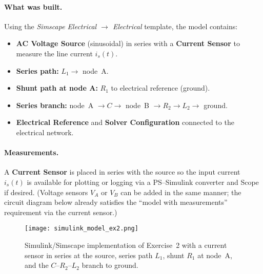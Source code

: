 \documentclass{article}
\begin{document}
\paragraph{What was built.}
Using the \emph{Simscape Electrical $\rightarrow$ Electrical} template, the model contains:
\begin{itemize}
  \item \textbf{AC Voltage Source} (sinusoidal) in series with a \textbf{Current Sensor} to measure the line current $i_s(t)$.
  \item \textbf{Series path:} $L_1 \rightarrow$ node~A.
  \item \textbf{Shunt path at node A:} $R_1$ to electrical reference (ground).
  \item \textbf{Series branch:} node~A $\rightarrow C \rightarrow$ node~B $\rightarrow R_2 \rightarrow L_2 \rightarrow$ ground.
  \item \textbf{Electrical Reference} and \textbf{Solver Configuration} connected to the electrical network.
\end{itemize}

\paragraph{Measurements.}
A \textbf{Current Sensor} is placed in series with the source so the input current $i_s(t)$ is available for plotting or logging via a PS--Simulink converter and Scope if desired. (Voltage sensors $V_A$ or $V_B$ can be added in the same manner; the circuit diagram below already satisfies the “model with measurements” requirement via the current sensor.)

\begin{figure}[H]
  \centering
  \texttt{[image: simulink\_model\_ex2.png]} %
  \caption{Simulink/Simscape implementation of Exercise~2 with a current sensor in series at the source, series path $L_1$, shunt $R_1$ at node~A, and the $C$--$R_2$--$L_2$ branch to ground.}
  \label{fig:simulink-ex2}
\end{figure}
\end{document}
